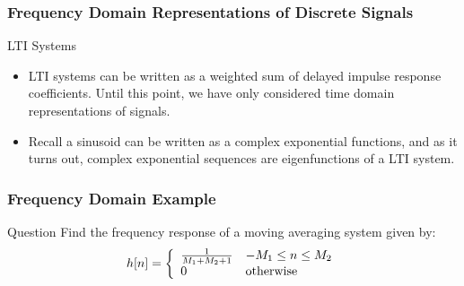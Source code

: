 \documentclass[mathserif,9pt,handout]{beamer}
\begin{document}
\begin{frame}\frametitle{Frequency Domain Representations of Discrete Signals}\small
  \begin{block}{LTI Systems}
    \begin{itemize}
      \item LTI systems can be written as a weighted sum of delayed impulse response coefficients. Until this point, we have only considered time domain representations of signals.   
      \item Recall a sinusoid can be written as a complex exponential functions, and as it turns out, complex exponential sequences are eigenfunctions of a LTI system. 
    \end{itemize}
  \end{block}
  
\end{frame}

\begin{frame}\frametitle{Frequency Domain Example}
   
   \begin{block}{Question}
   Find the frequency response of a moving averaging system  given by: 
   \begin{align}
     h[n] = \left\{
       \begin{array}{l l}
         \frac{1}{M_1+M_2+1} & -M_1 \leq n \leq M_2 \\
         0 & \textrm{otherwise}
       \end{array}
     \right. \nonumber
   \end{align}
   \end{block}
\end{frame}
\end{document}
